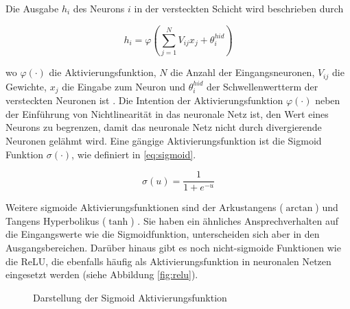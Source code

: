 Die Ausgabe $h_{i}$ des Neurons $i$ in der versteckten Schicht wird beschrieben durch

\begin{equation}
	h_{i} = \varphi(\sum_{j=1}^N{V_{ij}x_{j}+\theta_{i}^{hid}})
\end{equation}

wo $\varphi(\cdot)$ die Aktivierungsfunktion, $N$ die Anzahl der Eingangsneuronen, $V_{ij}$ die Gewichte, $x_{j}$ die Eingabe zum Neuron und $\theta_{i}^{hid}$ der Schwellenwertterm der versteckten Neuronen ist \cites[81-100]{Wang2003}[195-201]{Networks1995}. Die Intention der Aktivierungsfunktion $\varphi(\cdot)$ neben der Einführung von Nichtlinearität in das neuronale Netz ist, den Wert eines Neurons zu begrenzen, damit das neuronale Netz nicht durch divergierende Neuronen gelähmt wird. Eine gängige Aktivierungsfunktion ist die Sigmoid Funktion $\sigma(\cdot)$, wie definiert in \ref{eq:sigmoid}.

\begin{equation}\label{eq:sigmoid}
	\sigma(u) = \frac{1}{1 + e^{-u}}
\end{equation}


Weitere sigmoide Aktivierungsfunktionen sind der Arkustangens ($\arctan$) und Tangens Hyperbolikus ($\tanh$) \cite[195-201]{Networks1995}. Sie haben ein ähnliches Ansprechverhalten auf die Eingangswerte wie die Sigmoidfunktion, unterscheiden sich aber in den Ausgangsbereichen. Darüber hinaus gibt es noch nicht-sigmoide Funktionen wie die \ac{ReLU}, die ebenfalls häufig als Aktivierungsfunktion in neuronalen Netzen eingesetzt werden (siehe Abbildung \ref{fig:relu}).

\begin{figure}[htb]
\centering
{}
\caption{Darstellung der Sigmoid Aktivierungsfunktion}
\end{figure}

